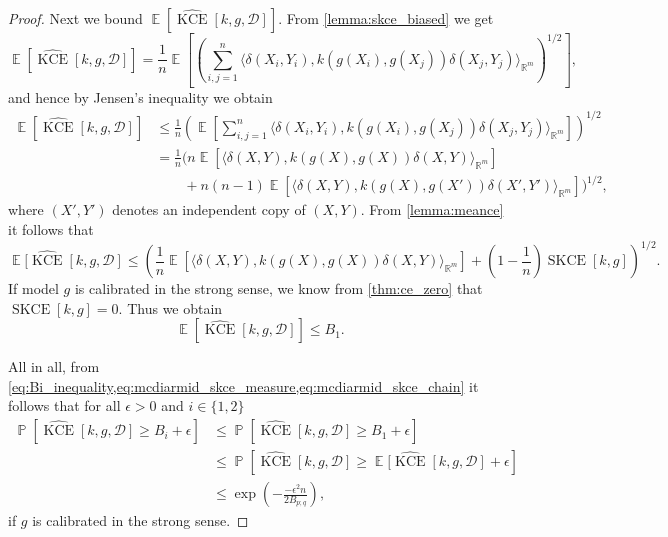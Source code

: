 \documentclass{article}
\DeclareMathOperator{\Prob}{\mathbb{P}}
\DeclareMathOperator{\Expect}{\mathbb{E}}
\DeclareMathOperator{\kernelmeasure}{KCE}
\DeclareMathOperator{\squaredkernelmeasure}{SKCE}
\begin{document}
\begin{proof}
  Next we bound $\Expect[\widehat{\kernelmeasure}[k, g, \mathcal{D}]]$. From
  \cref{lemma:skce_biased} we get
  \begin{equation*}
    \Expect[\widehat{\kernelmeasure}[k, g, \mathcal{D}]] = \frac{1}{n} \Expect\left[{\left(\sum_{i,j=1}^n \langle \delta(X_i, Y_i), k(g(X_i), g(X_j)) \delta(X_j,Y_j)\rangle_{\mathbb{R}^m}\right)}^{1/2} \right],
  \end{equation*}
  and hence by Jensen's inequality we obtain
  \begin{equation*}
    \begin{split}
      \Expect[\widehat{\kernelmeasure}[k, g, \mathcal{D}]] &\leq \frac{1}{n} {\left( \Expect\left[\sum_{i,j=1}^n \langle \delta(X_i, Y_i), k(g(X_i), g(X_j)) \delta(X_j,Y_j)\rangle_{\mathbb{R}^m}\right]\right)}^{1/2} \\
      &= \frac{1}{n} \bigg(n \Expect\left[\langle \delta(X, Y), k(g(X), g(X)) \delta(X,Y)\rangle_{\mathbb{R}^m}\right] \\
      &\qquad + n(n-1) \Expect\left[\langle \delta(X, Y), k(g(X), g(X')) \delta(X',Y')\rangle_{\mathbb{R}^m}\right] \bigg)^{1/2},
    \end{split}
  \end{equation*}
  where $(X',Y')$ denotes an independent copy of $(X,Y)$. From
  \cref{lemma:meance} it follows that
  \begin{equation*}
    \Expect[\widehat{\kernelmeasure}[k, g, \mathcal{D}] \leq \left(\frac{1}{n} \Expect\left[\langle \delta(X, Y), k(g(X), g(X)) \delta(X,Y)\rangle_{\mathbb{R}^m}\right] + \left(1 - \frac{1}{n}\right) \squaredkernelmeasure[k, g] \right)^{1/2}.
  \end{equation*}
  If model $g$ is calibrated in the strong sense, we know from \cref{thm:ce_zero}
  that $\squaredkernelmeasure[k, g] = 0$. Thus we obtain
  \begin{equation}\label{eq:mcdiarmid_skce_chain}
    \Expect[\widehat{\kernelmeasure}[k, g, \mathcal{D}]] \leq B_1.
  \end{equation}

  All in all, from
  \cref{eq:Bi_inequality,eq:mcdiarmid_skce_measure,eq:mcdiarmid_skce_chain} it
  follows that for all $\epsilon > 0$ and $i \in \{1,2\}$
  \begin{equation*}
    \begin{split}
      \Prob\left[\widehat{\kernelmeasure}[k, g, \mathcal{D}] \geq B_i + \epsilon\right] &\leq \Prob\left[\widehat{\kernelmeasure}[k, g, \mathcal{D}] \geq B_1 + \epsilon\right] \\
      &\leq \Prob\left[\widehat{\kernelmeasure}[k, g, \mathcal{D}] \geq \Expect[\widehat{\kernelmeasure}[k, g, \mathcal{D}] + \epsilon \right] \\
      &\leq \exp{\left(-\frac{- \epsilon^2 n}{2 B_{p;q}}\right)},
    \end{split}
  \end{equation*}
  if $g$ is calibrated in the strong sense.
\end{proof}
\end{document}
